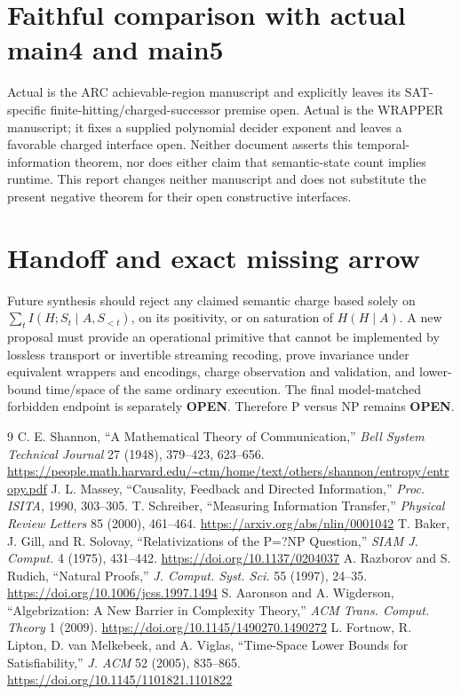 \documentclass[11pt]{article}
\newcommand{\OPEN}{\textbf{OPEN}}
\begin{document}
\section{Faithful comparison with actual main4 and main5}
Actual  is the ARC achievable-region manuscript and explicitly
leaves its SAT-specific finite-hitting/charged-successor premise open.  Actual
 is the WRAPPER manuscript; it fixes a supplied polynomial
decider exponent and leaves a favorable charged interface open.  Neither
document asserts this temporal-information theorem, nor does either claim
that semantic-state count implies runtime.  This report changes neither
manuscript and does not substitute the present negative theorem for their open
constructive interfaces.

\section{Handoff and exact missing arrow}
Future synthesis should reject any claimed semantic charge based solely on
\(\sum_t I(H;S_t\mid A,S_{<t})\), on its positivity, or on saturation of
\(H(H\mid A)\).  A new proposal must provide an operational primitive that
cannot be implemented by lossless transport or invertible streaming recoding,
prove invariance under equivalent wrappers and encodings, charge observation
and validation, and lower-bound time/space of the same ordinary execution.
The final model-matched forbidden endpoint is separately \OPEN.  Therefore
P versus NP remains \OPEN.

\begin{thebibliography}{9}
 C. E. Shannon, ``A Mathematical Theory of Communication,'' \emph{Bell System Technical Journal} 27 (1948), 379--423, 623--656. \url{https://people.math.harvard.edu/~ctm/home/text/others/shannon/entropy/entropy.pdf}
 J. L. Massey, ``Causality, Feedback and Directed Information,'' \emph{Proc. ISITA}, 1990, 303--305.
 T. Schreiber, ``Measuring Information Transfer,'' \emph{Physical Review Letters} 85 (2000), 461--464. \url{https://arxiv.org/abs/nlin/0001042}
 T. Baker, J. Gill, and R. Solovay, ``Relativizations of the P=?NP Question,'' \emph{SIAM J. Comput.} 4 (1975), 431--442. \url{https://doi.org/10.1137/0204037}
 A. Razborov and S. Rudich, ``Natural Proofs,'' \emph{J. Comput. Syst. Sci.} 55 (1997), 24--35. \url{https://doi.org/10.1006/jcss.1997.1494}
 S. Aaronson and A. Wigderson, ``Algebrization: A New Barrier in Complexity Theory,'' \emph{ACM Trans. Comput. Theory} 1 (2009). \url{https://doi.org/10.1145/1490270.1490272}
 L. Fortnow, R. Lipton, D. van Melkebeek, and A. Viglas, ``Time-Space Lower Bounds for Satisfiability,'' \emph{J. ACM} 52 (2005), 835--865. \url{https://doi.org/10.1145/1101821.1101822}
\end{thebibliography}

\end{document}
